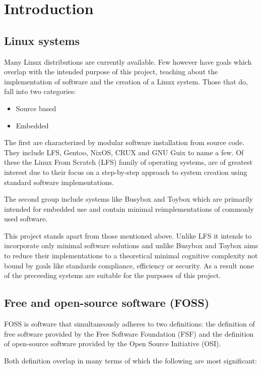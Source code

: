 \section{Introduction}\label{Introduction}

\subsection{Linux systems}

Many Linux distributions are currently available. Few however have goals which overlap with the intended purpose of this project, teaching about the implementation of software and the creation of a Linux system. Those that do, fall into two categories:

\begin{itemize}
    \item Source based
    \item Embedded
\end{itemize}

The first are characterized by modular software installation from source code. They include LFS, Gentoo, NixOS, CRUX and GNU Guix to name a few. Of these the Linux From Scratch (LFS) family of operating systems, are of greatest interest due to their focus on a step-by-step approach to system creation using standard software implementations. 

The second group include systems like Busybox and Toybox which are primarily intended for embedded use and contain minimal reimplementations of commonly used software.

This project stands apart from those mentioned above. Unlike LFS it intends to incorporate only minimal software solutions and unlike Busybox and Toybox aims to reduce their implementations to a theoretical minimal cognitive complexity not bound by goals like standards compliance, efficiency or security. As a result none of the preceeding systems are suitable for the purposes of this project.

\subsection{Free and open-source software (FOSS)}

FOSS is software that simultaneously adheres to two definitions: the definition of free software provided by the Free Software Foundation (FSF) and the definition of open-source software provided by the Open Source Initiative (OSI).

Both definition overlap in many terms of which the following are most significant:


